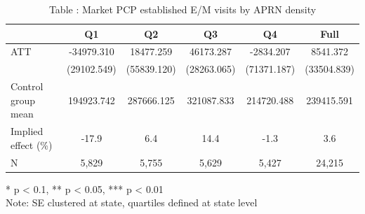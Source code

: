 \begin{table}[t]
\caption*{
{\fontsize{20}{25}\selectfont  Table : Market PCP established E/M visits by APRN density\fontsize{12}{15}\selectfont }
} 
\fontsize{12.0pt}{14.0pt}\selectfont
\begin{tabular*}{\linewidth}{@{\extracolsep{\fill}}lccccc}
\toprule
  & Q1 & Q2 & Q3 & Q4 & Full \\ 
\midrule\addlinespace[2.5pt]
ATT & -34979.310 & 18477.259 & 46173.287 & -2834.207 & 8541.372 \\ 
 & (29102.549) & (55839.120) & (28263.065) & (71371.187) & (33504.839) \\ 
Control group mean & 194923.742 & 287666.125 & 321087.833 & 214720.488 & 239415.591 \\ 
Implied effect (\%) & -17.9 & 6.4 & 14.4 & -1.3 & 3.6 \\ 
N & 5,829 & 5,755 & 5,629 & 5,427 & 24,215 \\ 
\bottomrule
\end{tabular*}
\begin{minipage}{\linewidth}
* p < 0.1, ** p < 0.05, *** p < 0.01\\
Note: SE clustered at state, quartiles defined at state level\\
\end{minipage}
\end{table}

